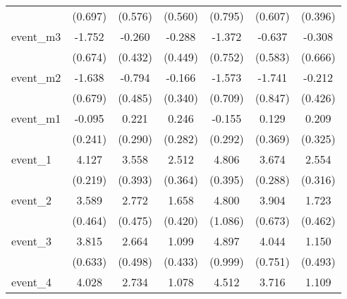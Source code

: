 {\begin{tabular}{l*{6}{c}}
            &     (0.697)         &     (0.576)         &     (0.560)         &     (0.795)         &     (0.607)         &     (0.396)         \\
[1em]
event\_m3    &      -1.752\sym{**} &      -0.260         &      -0.288         &      -1.372         &      -0.637         &      -0.308         \\
            &     (0.674)         &     (0.432)         &     (0.449)         &     (0.752)         &     (0.583)         &     (0.666)         \\
[1em]
event\_m2    &      -1.638\sym{*}  &      -0.794         &      -0.166         &      -1.573\sym{*}  &      -1.741\sym{*}  &      -0.212         \\
            &     (0.679)         &     (0.485)         &     (0.340)         &     (0.709)         &     (0.847)         &     (0.426)         \\
[1em]
event\_m1    &      -0.095         &       0.221         &       0.246         &      -0.155         &       0.129         &       0.209         \\
            &     (0.241)         &     (0.290)         &     (0.282)         &     (0.292)         &     (0.369)         &     (0.325)         \\
[1em]
event\_1     &       4.127\sym{***}&       3.558\sym{***}&       2.512\sym{***}&       4.806\sym{***}&       3.674\sym{***}&       2.554\sym{***}\\
            &     (0.219)         &     (0.393)         &     (0.364)         &     (0.395)         &     (0.288)         &     (0.316)         \\
[1em]
event\_2     &       3.589\sym{***}&       2.772\sym{***}&       1.658\sym{***}&       4.800\sym{***}&       3.904\sym{***}&       1.723\sym{***}\\
            &     (0.464)         &     (0.475)         &     (0.420)         &     (1.086)         &     (0.673)         &     (0.462)         \\
[1em]
event\_3     &       3.815\sym{***}&       2.664\sym{***}&       1.099\sym{*}  &       4.897\sym{***}&       4.044\sym{***}&       1.150\sym{*}  \\
            &     (0.633)         &     (0.498)         &     (0.433)         &     (0.999)         &     (0.751)         &     (0.493)         \\
[1em]
event\_4     &       4.028\sym{***}&       2.734\sym{***}&       1.078\sym{*}  &       4.512\sym{***}&       3.716\sym{***}&       1.109\sym{*}  \\

\end{tabular}}
